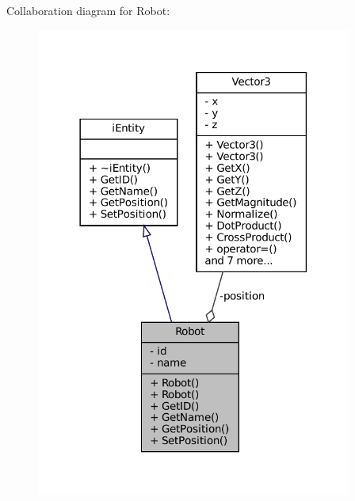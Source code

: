 Collaboration diagram for Robot\+:\nopagebreak
\begin{figure}[H]
\begin{center}
\leavevmode
\includegraphics[width=294pt]{classRobot__coll__graph}
\end{center}
\end{figure}
